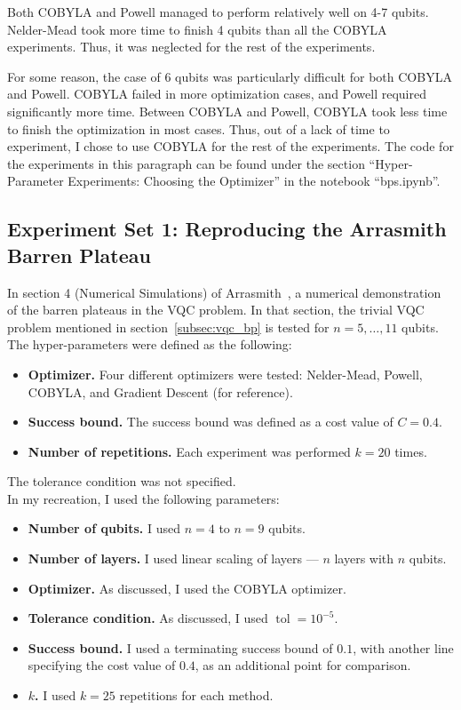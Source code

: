 \documentclass[a4paper,12pt]{article}
\newcommand{\e}[1]{ 10^{#1}}
\DeclareMathOperator{\tol}{tol}
\newenvironment{denseitemize}%
  {\begin{itemize}%
    \setlength{\itemsep}{0pt}}%
  {\end{itemize}}
\begin{document}
Both COBYLA and Powell managed to perform relatively well on 4-7 qubits.
Nelder-Mead took more time to finish 4 qubits than all the COBYLA experiments. Thus, it was neglected for the rest of the experiments.

For some reason, the case of 6 qubits was particularly difficult for both COBYLA and Powell. COBYLA failed in more optimization cases, and Powell required significantly more time. 
Between COBYLA and Powell, COBYLA took less time to finish the optimization in most cases. Thus, out of a lack of time to experiment, I chose to use COBYLA for the rest of the experiments.
The code for the experiments in this paragraph can be found under the section ``Hyper-Parameter Experiments: Choosing the Optimizer'' in the notebook ``bps.ipynb''.

\subsection{Experiment Set 1: Reproducing the Arrasmith Barren Plateau} \label{subsec:reproduce}
In section 4 (Numerical Simulations) of Arrasmith~\cite{arrasmith_effect_2021}, a numerical demonstration of the barren plateaus in the VQC problem.
In that section, the trivial VQC problem mentioned in section~\ref{subsec:vqc_bp} is tested for $n=5,\dots,11$ qubits.
The hyper-parameters were defined as the following:
\begin{denseitemize}
    \item \textbf{Optimizer.} Four different optimizers were tested: Nelder-Mead, Powell, COBYLA, and Gradient Descent (for reference).
    \item \textbf{Success bound.} The success bound was defined as a cost value of $C=0.4$.
    \item \textbf{Number of repetitions.} Each experiment was performed $k=20$ times.
\end{denseitemize}
The tolerance condition was not specified.\\

In my recreation, I used the following parameters:

\begin{denseitemize}
    \item \textbf{Number of qubits.} I used $n=4$ to $n=9$ qubits.
    \item \textbf{Number of layers.} I used linear scaling of layers --- $n$ layers with $n$ qubits.
    \item \textbf{Optimizer.} As discussed, I used the COBYLA optimizer.
    \item \textbf{Tolerance condition.} As discussed, I used $\tol=\e{-5}$.
    \item \textbf{Success bound.} I used a terminating success bound of $0.1$, with another line specifying the cost value of $0.4$, as an additional point for comparison.
    \item \textbf{$k$.} I used $k=25$ repetitions for each method.
\end{denseitemize}
\end{document}
